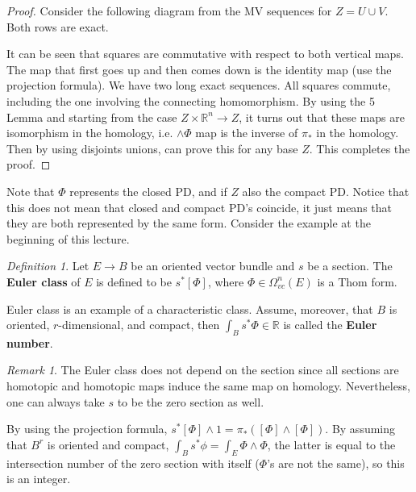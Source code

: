 \documentclass[12pt]{amsart}
\newcommand{\R}{\mathbb{R}} %
\theoremstyle{remark}
\newtheorem{definition}{Definition}
\newtheorem{remark}{Remark}
\begin{document}
\begin{proof}
Consider the following diagram from the MV sequences for $Z=U\cup V$. Both rows are exact.
\begin{center}
\end{center}
It can be seen that squares are commutative with respect to both vertical maps. The map that first goes up and then comes down is the identity map (use the projection formula). We have two long exact sequences. All squares commute, including the one involving the connecting homomorphism. By using the 5 Lemma and starting from the case $Z\times \R^n\to Z$, it turns out that these maps are isomorphism in the homology, i.e. $\wedge \Phi$ map is the inverse of $\pi_*$ in the homology. Then by using disjoints unions, can prove this for any base $Z$. This completes the proof. 
\end{proof}
Note that $\Phi$ represents the closed PD, and if $Z$ also the compact PD. Notice that this does not mean that closed and compact PD's coincide, it just means that they are both represented by the same form. Consider the example at the beginning of this lecture. 
\begin{definition}
Let $E\to B$ be an oriented vector bundle and $s$ be a section. The \textbf{Euler class} of $E$ is defined to be $s^*[\Phi]$, where $\Phi\in \Omega_{vc}^n(E)$ is a Thom form.
\end{definition}
Euler class is an example of a characteristic class. Assume, moreover, that $B$ is oriented, $r$-dimensional, and compact, then $\int_B s^*\Phi\in \R$ is called the \textbf{Euler number}.
\begin{remark}
The Euler class does not depend on the section since all sections are homotopic and homotopic maps induce the same map on homology. Nevertheless, one can always take $s$ to be the zero section as well. 
\end{remark}
By using the projection formula, $s^*[\Phi]\wedge 1=\pi_*([\Phi]\wedge[\Phi])$. By assuming that $B^r$ is oriented and compact, $\int_B s^*\phi=\int_E\Phi\wedge\Phi$, the latter is equal to the intersection number of the zero section with itself ($\Phi$'s are not the same), so this is an integer. 
\end{document}
